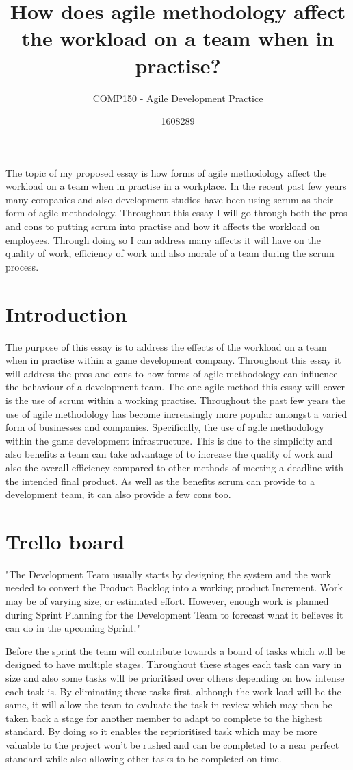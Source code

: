 \documentclass{scrartcl}
\title{How does agile methodology affect the workload on a team when in practise?}
\subtitle{COMP150 - Agile Development Practice}
\author{1608289}
\begin{document}
\maketitle


The topic of my proposed essay is how forms of agile methodology affect the workload on a team when in practise in a workplace. In the recent past few years many companies and also development studios have been using scrum as their form of agile methodology. Throughout this essay I will go through both the pros and cons to putting scrum into practise and how it affects the workload on employees. Through doing so I can address many affects it will have on the quality of work, efficiency of work and also morale of a team during the scrum process. 

\section{Introduction}
The purpose of this essay is to address the effects of the workload on a team when in practise within a game development company. Throughout this essay it will address the pros and cons to how forms of agile methodology can influence the behaviour of a development team. The one agile method this essay will cover is the use of scrum within a working practise. Throughout the past few years the use of agile methodology has become increasingly more popular amongst a varied form of businesses and companies. Specifically, the use of agile methodology within the game development infrastructure. This is due to the simplicity and also benefits a team can take advantage of to increase the quality of work and also the overall efficiency compared to other methods of meeting a deadline with the intended final product. As well as the benefits scrum can provide to a development team, it can also provide a few cons too. 

\section{Trello board}
"The Development Team usually starts by designing the system and the work needed to convert the Product Backlog into a working product Increment. Work may be of varying size, or estimated effort. However, enough work is planned during Sprint Planning for the Development Team to forecast what it believes it can do in the upcoming Sprint." \cite{scrumalliance}

Before the sprint the team will contribute towards a board of tasks which will be designed to have multiple stages. Throughout these stages each task can vary in size and also some tasks will be prioritised over others depending on how intense each task is. By eliminating these tasks first, although the work load will be the same, it will allow the team to evaluate the task in review which may then be taken back a stage for another member to adapt to complete to the highest standard. By doing so it enables the reprioritised task which may be more valuable to the project won’t be rushed and can be completed to a near perfect standard while also allowing other tasks to be completed on time.
\end{document}
